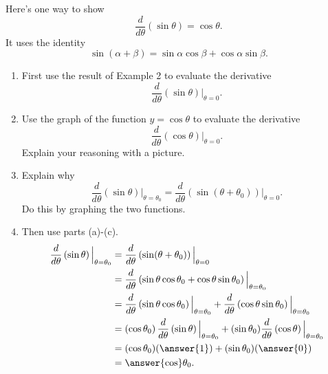 \documentclass{ximera}
\begin{document}
\begin{example}  \label{ExMV21er}
Here's one way to show
\[
   \frac{d}{d\theta}\left(  \sin\theta \right) = \cos\theta.
\]
 It uses the identity
\[
 \sin(\alpha + \beta) = \sin\alpha \cos\beta + \cos \alpha \sin\beta.
\]


\begin{enumerate}

\item First use the result of Example 2 to evaluate the derivative
\[
   \frac{d}{d\theta}\left(  \sin\theta \right) \Big|_{\theta=0} .
\]

\item Use the graph of the function $y=\cos\theta$ to evaluate the derivative
\[
  \frac{d}{d\theta}\left(  \cos\theta \right) \Big|_{\theta=0} .
\]
Explain your reasoning with a picture.
\begin{freeResponse}
\end{freeResponse}


\item Explain why
\[
      \frac{d}{d\theta}\left(  \sin\theta \right) \Big|_{\theta = \theta_0} = \frac{d}{d\theta}\left(  \sin(\theta + \theta_0)\right) \Big|_{\theta = 0}.
\]
Do this by graphing the two functions.
\begin{freeResponse}
\end{freeResponse}

\item Then use parts (a)-(c).
\begin{align*}
 \frac{d}{d\theta}\left(  \sin\theta \right) \Big|_{\theta = \theta_0} &= \frac{d}{d\theta}\left(  \sin(\theta + \theta_0)\right) \Big|_{\theta = 0} \\
                    &= \frac{d}{d\theta} \left( \sin\theta\cos\theta_0 + \cos\theta \sin\theta_0  \right)\Big|_{\theta = \theta_0} \\
                    &= \frac{d}{d\theta} \left( \sin\theta\cos\theta_0 \right)\Big|_{\theta = \theta_0} + \frac{d}{d\theta} \left( \cos\theta\sin\theta_0 \right)\Big|_{\theta = \theta_0}  \\
                    &= \left( \cos\theta_0 \right)  \frac{d}{d\theta} \left( \sin\theta \right)\Big|_{\theta = \theta_0} + (\sin\theta_0) \frac{d}{d\theta}\left( \cos\theta \right)\Big|_{\theta = \theta_0} \\
                    &= (\cos\theta_0)(\answer{1}) + (\sin\theta_0)(\answer{0})  \\
                    & = \answer{\cos} \theta_0 .
\end{align*}

\end{enumerate}
\end{example}
\end{document}
